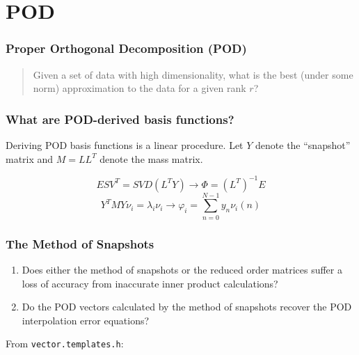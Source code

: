 \documentclass[mathserif]{beamer}
\begin{document}
\section{POD}
\begin{frame}
    \frametitle{Proper Orthogonal Decomposition (POD)}
    \begin{quote}
        Given a set of data with high dimensionality, what is the best (under
        some norm) approximation to the data for a given rank \(r\)?
    \end{quote}
\end{frame}

\begin{frame}
    \frametitle{What are POD-derived basis functions?}
    Deriving POD basis functions is a linear procedure. Let \(Y\) denote the
    ``snapshot'' matrix \cite{Sir87abc} and \(M = L L^T\) denote the mass
    matrix.

    \pause
    \begin{equation}
        E S V^T = SVD(L^T Y) \rightarrow \Phi = (L^T)^{-1} E
    \end{equation}
    \pause
    \begin{equation}
        Y^T M Y \nu_i = \lambda_i \nu_i
        \rightarrow
        \varphi_i = \sum_{n = 0}^{N - 1} y_n \nu_i(n)
    \end{equation}
\end{frame}

\begin{frame}
    \frametitle{The Method of Snapshots}
    \begin{enumerate}
        \item Does either the method of snapshots or the reduced order matrices
              suffer a loss of accuracy from inaccurate inner product
              calculations?
              \pause
        \item Do the POD vectors calculated by the method of snapshots recover
              the POD interpolation error equations?
    \end{enumerate}
\end{frame}

\begin{frame}
    From \texttt{vector.templates.h}:
    \begin{center}
        {\scriptsize
          
        }
    \end{center}
\end{frame}
\end{document}
